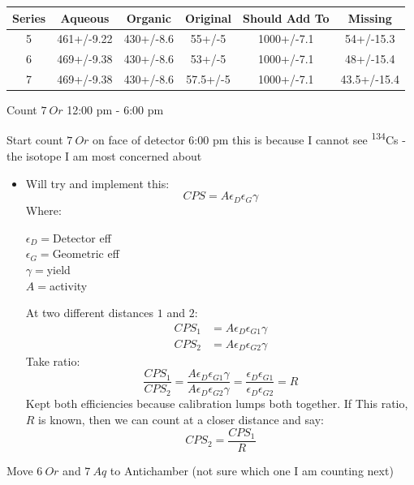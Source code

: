 \documentclass[idxtotoc,hyperref,openany,oneside]{labbook} %
\newcommand{\cmark}{\ding{51}}%
\newcommand{\done}{\rlap{$\square$}{\raisebox{2pt}{\large\hspace{1pt}\cmark}}%
  \hspace{-2.5pt}}
\newcommand{\tss}{\textsuperscript}
\begin{document}
\begin{center}
  \begin{tabular}{||c c c c c c||}
    \hline
    Series & Aqueous & Organic & Original & Should Add To & Missing\\ [0.5ex]
    \hline\hline
    5 & 461+/-9.22 & 430+/-8.6 & 55+/-5 & 1000+/-7.1 & 54+/-15.3\\
    \hline
    6 & 469+/-9.38 & 430+/-8.6 & 53+/-5 & 1000+/-7.1 & 48+/-15.4\\
    \hline
    7 & 469+/-9.38 & 430+/-8.6 & 57.5+/-5 & 1000+/-7.1 & 43.5+/-15.4\\
    \hline
  \end{tabular}
\end{center}

\begin{todolist}
\item[\done]{Count $\boxed{7\ Or}$ 12:00 pm - 6:00 pm}
\item[\done]{Start count $\boxed{7\ Or}$ on face of detector 6:00 pm
  this is because I cannot see \tss{134}Cs - the isotope I am
  most concerned about}
  \begin{itemize}
  \item{Will try and implement this:}
    $$CPS=A\epsilon_D\epsilon_G\gamma$$
    Where:
    \begin{center}
    $\epsilon_D=$Detector eff\\
    $\epsilon_G=$Geometric eff\\
    $\gamma=$yield\\
      $A=$activity
    \end{center}
    At two different distances $1$ and $2$:
    \begin{align*}
      CPS_1&=A\epsilon_D\epsilon_{G1}\gamma\\
      CPS_2&=A\epsilon_D\epsilon_{G2}\gamma
    \end{align*}
    Take ratio:
    \begin{equation*}
      \frac{CPS_1}{CPS_2}=\frac{A\epsilon_D\epsilon_{G1}\gamma}
           {A\epsilon_D\epsilon_{G2}\gamma}=
           \frac{\epsilon_D\epsilon_{G1}}{\epsilon_D\epsilon_{G2}}
           =R
    \end{equation*}
    Kept both efficiencies because calibration lumps both together.
    If This ratio, $R$ is known, then we can count at a closer
    distance and say:
    \begin{equation*}
      CPS_2=\frac{CPS_1}{R}
    \end{equation*}
  \end{itemize}
\item[\done]{Move $\boxed{6\ Or}$ and $\boxed{7\ Aq}$ to Antichamber
  (not sure which one I am counting next)}
\end{todolist}
\end{document}
